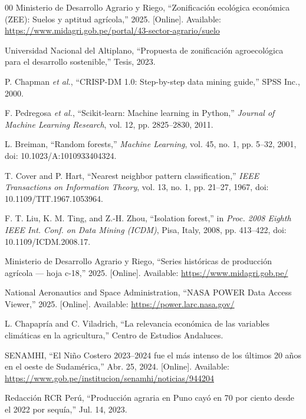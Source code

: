 \documentclass[conference]{IEEEtran}
\begin{document}
\begin{thebibliography}{00}
 Ministerio de Desarrollo Agrario y Riego, ``Zonificación ecológica económica (ZEE): Suelos y aptitud agrícola,'' 2025. [Online]. Available: \url{https://www.midagri.gob.pe/portal/43-sector-agrario/suelo}

 Universidad Nacional del Altiplano, ``Propuesta de zonificación agroecológica para el desarrollo sostenible,'' Tesis, 2023.

 P. Chapman \textit{et al.}, ``CRISP-DM 1.0: Step-by-step data mining guide,'' SPSS Inc., 2000.

 F. Pedregosa \textit{et al.}, ``Scikit-learn: Machine learning in Python,'' \textit{Journal of Machine Learning Research}, vol. 12, pp. 2825--2830, 2011.

 L. Breiman, ``Random forests,'' \textit{Machine Learning}, vol. 45, no. 1, pp. 5--32, 2001, doi: 10.1023/A:1010933404324.

 T. Cover and P. Hart, ``Nearest neighbor pattern classification,'' \textit{IEEE Transactions on Information Theory}, vol. 13, no. 1, pp. 21--27, 1967, doi: 10.1109/TIT.1967.1053964.

 F. T. Liu, K. M. Ting, and Z.-H. Zhou, ``Isolation forest,'' in \textit{Proc. 2008 Eighth IEEE Int. Conf. on Data Mining (ICDM)}, Pisa, Italy, 2008, pp. 413--422, doi: 10.1109/ICDM.2008.17.

 Ministerio de Desarrollo Agrario y Riego, ``Series históricas de producción agrícola --- hoja c-18,'' 2025. [Online]. Available: \url{https://www.midagri.gob.pe/}

 National Aeronautics and Space Administration, ``NASA POWER Data Access Viewer,'' 2025. [Online]. Available: \url{https://power.larc.nasa.gov/}

 L. Chapapría and C. Viladrich, ``La relevancia económica de las variables climáticas en la agricultura,'' Centro de Estudios Andaluces.

 SENAMHI, ``El Niño Costero 2023--2024 fue el más intenso de los últimos 20 años en el oeste de Sudamérica,'' Abr. 25, 2024. [Online]. Available: \url{https://www.gob.pe/institucion/senamhi/noticias/944204}

 Redacción RCR Perú, ``Producción agraria en Puno cayó en 70 por ciento desde el 2022 por sequía,'' Jul. 14, 2023.


\end{thebibliography}
\end{document}
